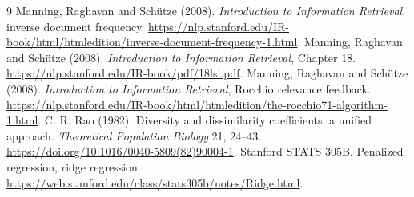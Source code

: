 \documentclass[11pt,a4paper]{article}
\begin{document}
\begin{thebibliography}{9}
 Manning, Raghavan and Sch\"utze (2008).
\emph{Introduction to Information Retrieval}, inverse document frequency.
\url{https://nlp.stanford.edu/IR-book/html/htmledition/inverse-document-frequency-1.html}.
 Manning, Raghavan and Sch\"utze (2008).
\emph{Introduction to Information Retrieval}, Chapter 18.
\url{https://nlp.stanford.edu/IR-book/pdf/18lsi.pdf}.
 Manning, Raghavan and Sch\"utze (2008).
\emph{Introduction to Information Retrieval}, Rocchio relevance feedback.
\url{https://nlp.stanford.edu/IR-book/html/htmledition/the-rocchio71-algorithm-1.html}.
 C. R. Rao (1982). Diversity and dissimilarity coefficients:
a unified approach. \emph{Theoretical Population Biology} 21, 24--43.
\url{https://doi.org/10.1016/0040-5809(82)90004-1}.
 Stanford STATS 305B. Penalized regression, ridge regression.
\url{https://web.stanford.edu/class/stats305b/notes/Ridge.html}.
\end{thebibliography}
\end{document}
